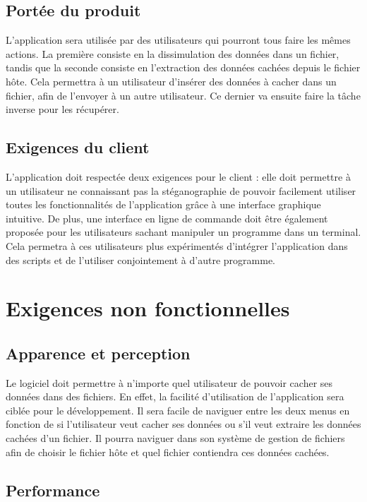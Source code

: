 \documentclass[11pt]{article}
\begin{document}
\subsection{Portée du produit}

L'application sera utilisée par des utilisateurs qui pourront tous faire les
mêmes actions. La première consiste en la dissimulation des données dans un
fichier, tandis que la seconde consiste en l'extraction des données cachées
depuis le fichier hôte. Cela permettra à un utilisateur d'insérer des données à
cacher dans un fichier, afin de l'envoyer à un autre utilisateur. Ce dernier va
ensuite faire la tâche inverse pour les récupérer.

\subsection{Exigences du client}

L'application doit respectée deux exigences pour le client : elle doit permettre
à un utilisateur ne connaissant pas la stéganographie de pouvoir facilement
utiliser toutes les fonctionnalités de l'application grâce à une interface
graphique intuitive. De plus, une interface en ligne de commande doit être
également proposée pour les utilisateurs sachant manipuler un programme dans un
terminal. Cela permetra à ces utilisateurs plus expérimentés d'intégrer
l'application dans des scripts et de l'utiliser conjointement à d'autre
programme.

\section{Exigences non fonctionnelles}

\subsection{Apparence et perception}

Le logiciel doit permettre à n'importe quel utilisateur de pouvoir cacher ses
données dans des fichiers. En effet, la facilité d'utilisation de l'application
sera ciblée pour le développement. Il sera facile de naviguer entre les deux
menus en fonction de si l'utilisateur veut cacher ses données ou s'il veut
extraire les données cachées d'un fichier. Il pourra naviguer dans son système
de gestion de fichiers afin de choisir le fichier hôte et quel fichier
contiendra ces données cachées. 

\subsection{Performance}
\end{document}
